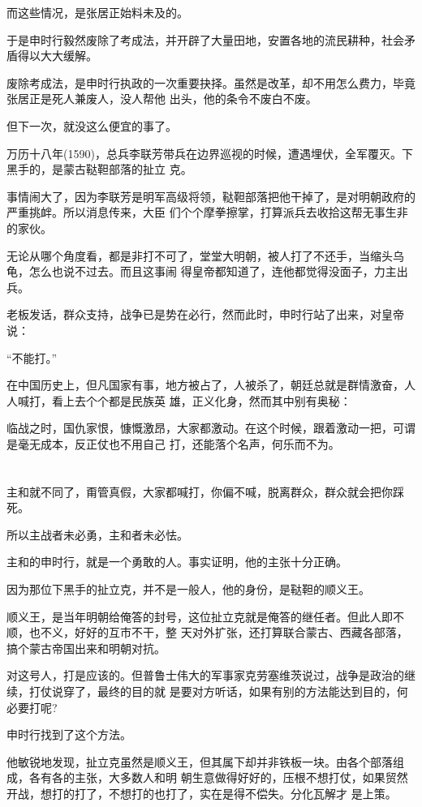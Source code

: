 \documentclass[11pt,a4paper,onecolumn]{article}
\begin{document}
而这些情况，是张居正始料未及的。

于是申时行毅然废除了考成法，并开辟了大量田地，安置各地的流民耕种，社会矛盾得以大大缓解。

废除考成法，是申时行执政的一次重要抉择。虽然是改革，却不用怎么费力，毕竟张居正是死人兼废人，没人帮他
出头，他的条令不废白不废。

但下一次，就没这么便宜的事了。

万历十八年(1590)，总兵李联芳带兵在边界巡视的时候，遭遇埋伏，全军覆灭。下黑手的，是蒙古鞑靼部落的扯立
克。

事情闹大了，因为李联芳是明军高级将领，鞑靼部落把他干掉了，是对明朝政府的严重挑衅。所以消息传来，大臣
们个个摩拳擦掌，打算派兵去收拾这帮无事生非的家伙。

无论从哪个角度看，都是非打不可了，堂堂大明朝，被人打了不还手，当缩头乌龟，怎么也说不过去。而且这事闹
得皇帝都知道了，连他都觉得没面子，力主出兵。

老板发话，群众支持，战争已是势在必行，然而此时，申时行站了出来，对皇帝说：

``不能打。''

在中国历史上，但凡国家有事，地方被占了，人被杀了，朝廷总就是群情激奋，人人喊打，看上去个个都是民族英
雄，正义化身，然而其中别有奥秘：

临战之时，国仇家恨，慷慨激昂，大家都激动。在这个时候，跟着激动一把，可谓是毫无成本，反正仗也不用自己
打，还能落个名声，何乐而不为。

\section[\thesection]{}

主和就不同了，甭管真假，大家都喊打，你偏不喊，脱离群众，群众就会把你踩死。

所以主战者未必勇，主和者未必怯。

主和的申时行，就是一个勇敢的人。事实证明，他的主张十分正确。

因为那位下黑手的扯立克，并不是一般人，他的身份，是鞑靼的顺义王。

顺义王，是当年明朝给俺答的封号，这位扯立克就是俺答的继任者。但此人即不顺，也不义，好好的互市不干，整
天对外扩张，还打算联合蒙古、西藏各部落，搞个蒙古帝国出来和明朝对抗。

对这号人，打是应该的。但普鲁士伟大的军事家克劳塞维茨说过，战争是政治的继续，打仗说穿了，最终的目的就
是要对方听话，如果有别的方法能达到目的，何必要打呢?

申时行找到了这个方法。

他敏锐地发现，扯立克虽然是顺义王，但其属下却并非铁板一块。由各个部落组成，各有各的主张，大多数人和明
朝生意做得好好的，压根不想打仗，如果贸然开战，想打的打了，不想打的也打了，实在是得不偿失。分化瓦解才
是上策。
\end{document}
